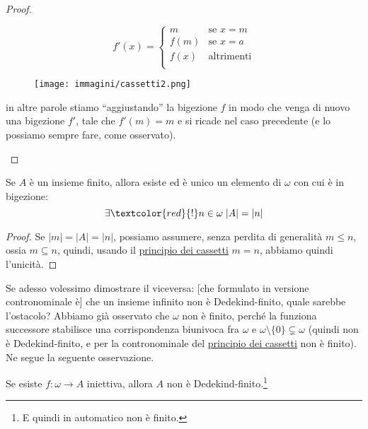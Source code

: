 \documentclass[11pt]{scrartcl}
\begin{document}
\begin{proof}
\begin{itemize}
		\[ f'(x) = \begin{cases}
			m &\text{se $x = m$} \\
			f(m) &\text{se $x = a$} \\
			f(x) &\text{altrimenti} \\
		\end{cases}
			\]
			\begin{figure}[H]
				\centering
				\texttt{[image: immagini/cassetti2.png]}
			\end{figure}
		in altre parole stiamo ``aggiustando'' la bigezione $f$ in modo che venga di nuovo una bigezione $f'$, tale che $f'(m) = m$ e si ricade nel caso precedente (e lo possiamo sempre fare, come osservato).
	\end{itemize}
\end{proof}

\begin{corollary}
	Se $A$ è un insieme finito, allora esiste ed è unico un elemento di $\omega$ con cui è in bigezione:
	\[ \exists \textcolor{red}{!} n \in \omega \; |A| = |n|
		\]
\end{corollary}

\begin{proof}
	Se $|m| = |A| = |n|$, possiamo assumere, senza perdita di generalità $m \leq n$, ossia $m \subseteq n$, quindi, usando il \hyperref[cassetti]{principio dei cassetti} $m = n$, abbiamo quindi l'unicità.
\end{proof}

Se adesso volessimo dimostrare il viceversa: [che formulato in versione contronominale è] che un insieme infinito non è Dedekind-finito, quale sarebbe l'ostacolo? Abbiamo già osservato che $\omega$ non è finito, perché la funziona successore 
stabilisce una corrispondenza biunivoca fra $\omega$ e $\omega \setminus\{0\} \subsetneq \omega$ (quindi non è Dedekind-finito, e per la contronominale del \hyperref[cassetti]{principio dei cassetti} non è finito). Ne segue la seguente osservazione.

\begin{remark}
	\label{omega_Dedekind_finito}
	Se esiste $f : \omega \rightarrow A$ iniettiva, allora $A$ non è Dedekind-finito.\footnote{E quindi in automatico non è finito.}
\end{remark}
\end{document}
